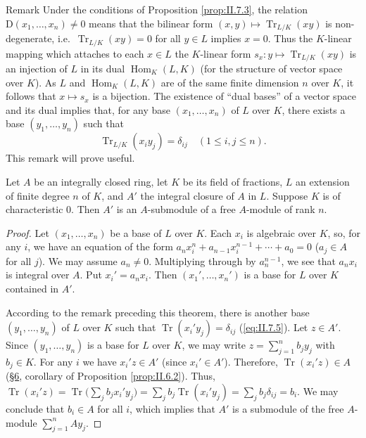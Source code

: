 \begin{statement}{Remark}
Under the conditions of Proposition \ref{prop:II.7.3}, the relation
$\mathrm{D}(x_{1},\ldots,x_{n})\neq0$ means that the bilinear form
$(x,y)\mapsto\operatorname{Tr}_{L/K}(xy)$ is non-degenerate, i.e.\
$\operatorname{Tr}_{L/K}(xy)=0$ for all $y\in L$ implies $x=0$. Thus the
$K$-linear mapping which attaches to each $x\in L$ the $K$-linear form
$s_{x}:y\mapsto\operatorname{Tr}_{L/K}(xy)$ is an injection of $L$ in its
dual $\operatorname{Hom}_{K}(L,K)$ (for the structure of vector space over
$K$). As $L$ and $\operatorname{Hom}_{K}(L,K)$ are of the same finite
dimension $n$ over $K$, it follows that $x\mapsto s_{x}$ is a bijection. The
existence of ``dual bases'' of a vector space and its dual implies that, for
any base $(x_{1},\ldots,x_{n})$ of $L$ over $K$, there exists a base
$(y_{1},\ldots,y_{n})$ such that
\begin{equation}
\operatorname{Tr}_{L/K}(x_{i}y_{j})=\delta_{ij}\quad(1\leq i,j\leq n).
\label{eq:II.7.5}
\end{equation}
This remark will prove useful.
\end{statement}

\begin{theorem}
\label{thm:II.7.1}
Let $A$ be an integrally closed ring, let $K$ be its field of fractions, $L$
an extension of finite degree $n$ of $K$, and $A'$ the integral closure of
$A$ in $L$. Suppose $K$ is of characteristic $0$. Then $A'$ is an
$A$-submodule of a free $A$-module of rank $n$.
\end{theorem}

\begin{proof}
Let $(x_{1},\ldots,x_{n})$ be a base of $L$ over $K$. Each $x_{i}$ is
algebraic over $K$, so, for any $i$, we have an equation of the form
$a_{n}x_{i}^{n}+a_{n-1}x_{i}^{n-1}+\cdots+a_{0}=0$ ($a_{j}\in A$ for all
$j$). We may assume $a_{n}\neq0$. Multiplying through by $a_{n}^{n-1}$, we
see that $a_{n}x_{i}$ is integral over $A$. Put $x_{i}'=a_{n}x_{i}$. Then
$(x_{1}',\ldots,x_{n}')$ is a base for $L$ over $K$ contained in $A'$.

According to the remark preceding this theorem, there is another base
$(y_{1},\ldots,y_{n})$ of $L$ over $K$ such that
$\operatorname{Tr}(x_{i}'y_{j})=\delta_{ij}$ (\eqref{eq:II.7.5}). Let
$z\in A'$. Since $(y_{1},\ldots,y_{n})$ is a base for $L$ over $K$, we may
write $z=\sum_{j=1}^{n}b_{j}y_{j}$ with $b_{j}\in K$. For any $i$ we have
$x_{i}'z\in A'$ (since $x_{i}'\in A'$). Therefore,
$\operatorname{Tr}(x_{i}'z)\in A$ (\hyperref[sec:2.6]{§6}, corollary of Proposition
\ref{prop:II.6.2}). Thus,
$\operatorname{Tr}(x_{i}'z)=\operatorname{Tr}\bigl(\sum_{j}b_{j}
x_{i}'y_{j}\bigr)=\sum_{j}b_{j}\operatorname{Tr}(x_{i}'y_{j})
=\sum_{j}b_{j}\delta_{ij}=b_{i}$. We may conclude that $b_{i}\in A$ for all
$i$, which implies that $A'$ is a submodule of the free $A$-module
$\sum_{j=1}^{n}Ay_{j}$.
\end{proof}

